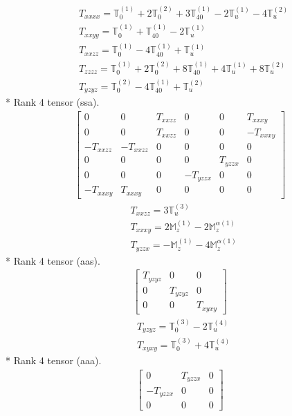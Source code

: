 \documentclass[fleqn,8pt,landscape]{jsarticle}
\begin{document}
\begin{align*}
& T_{xxxx} = \mathbb{T}_{0}^{(1)} + 2 \mathbb{T}_{0}^{(2)} + 3 \mathbb{T}_{40}^{(1)} - 2 \mathbb{T}_{u}^{(1)} - 4 \mathbb{T}_{u}^{(2)} \\
& T_{xxyy} = \mathbb{T}_{0}^{(1)} + \mathbb{T}_{40}^{(1)} - 2 \mathbb{T}_{u}^{(1)} \\
& T_{xxzz} = \mathbb{T}_{0}^{(1)} - 4 \mathbb{T}_{40}^{(1)} + \mathbb{T}_{u}^{(1)} \\
& T_{zzzz} = \mathbb{T}_{0}^{(1)} + 2 \mathbb{T}_{0}^{(2)} + 8 \mathbb{T}_{40}^{(1)} + 4 \mathbb{T}_{u}^{(1)} + 8 \mathbb{T}_{u}^{(2)} \\
& T_{yzyz} = \mathbb{T}_{0}^{(2)} - 4 \mathbb{T}_{40}^{(1)} + \mathbb{T}_{u}^{(2)}
\end{align*}
* Rank 4 tensor (ssa).
\begin{align*}
\begin{bmatrix} 0 & 0 & T_{xxzz} & 0 & 0 & T_{xxxy} \\ 0 & 0 & T_{xxzz} & 0 & 0 & - T_{xxxy} \\ - T_{xxzz} & - T_{xxzz} & 0 & 0 & 0 & 0 \\ 0 & 0 & 0 & 0 & T_{yzzx} & 0 \\ 0 & 0 & 0 & - T_{yzzx} & 0 & 0 \\ - T_{xxxy} & T_{xxxy} & 0 & 0 & 0 & 0 \end{bmatrix}
\end{align*}
\begin{align*}
& T_{xxzz} = 3 \mathbb{T}_{u}^{(3)} \\
& T_{xxxy} = 2 \mathbb{M}_{z}^{(1)} - 2 \mathbb{M}_{z}^{\alpha(1)} \\
& T_{yzzx} = - \mathbb{M}_{z}^{(1)} - 4 \mathbb{M}_{z}^{\alpha(1)}
\end{align*}
* Rank 4 tensor (aas).
\begin{align*}
\begin{bmatrix} T_{yzyz} & 0 & 0 \\ 0 & T_{yzyz} & 0 \\ 0 & 0 & T_{xyxy} \end{bmatrix}
\end{align*}
\begin{align*}
& T_{yzyz} = \mathbb{T}_{0}^{(3)} - 2 \mathbb{T}_{u}^{(4)} \\
& T_{xyxy} = \mathbb{T}_{0}^{(3)} + 4 \mathbb{T}_{u}^{(4)}
\end{align*}
* Rank 4 tensor (aaa).
\begin{align*}
\begin{bmatrix} 0 & T_{yzzx} & 0 \\ - T_{yzzx} & 0 & 0 \\ 0 & 0 & 0 \end{bmatrix}
\end{align*}
\end{document}

